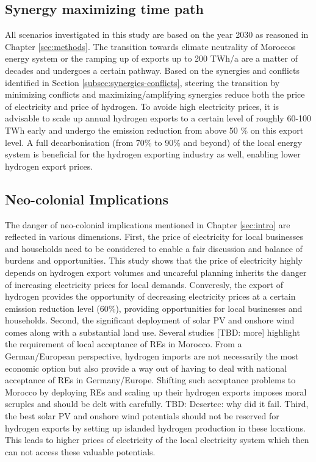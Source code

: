 \subsection{Synergy maximizing time path}
\label{subsec:timepath}
All scenarios investigated in this study are based on the year 2030 as reasoned in Chapter \ref{sec:methods}. The transition towards climate neutrality of Moroccos energy system or the ramping up of exports up to 200 TWh/a are a matter of decades and undergoes a certain pathway. Based on the synergies and conflicts identified in Section \ref{subsec:synergies-conflicts}, steering the transition by minimizing conflicts and maximizing/amplifying synergies reduce both the price of electricity and price of hydrogen. To avoide high electricity prices, it is advisable to scale up annual hydrogen exports to a certain level of roughly 60-100 TWh early and undergo the emission reduction from above 50 \% on this export level. A full decarbonisation (from 70\% to 90\% and beyond) of the local energy system is beneficial for the hydrogen exporting industry as well, enabling lower hydrogen export prices.


\subsection{Neo-colonial Implications}
\label{subsec:neocolonial}
The danger of neo-colonial implications mentioned in Chapter \ref{sec:intro} are reflected in various dimensions. 
First, the price of electricity for local businesses and households need to be considered to enable a fair discussion and balance of burdens and opportunities. This study shows that the price of electricity highly depends on hydrogen export volumes and uncareful planning inherits the danger of increasing electricity prices for local demands. Converesly, the export of hydrogen provides the opportunity of decreasing electricity prices at a certain emission reduction level (60\%), providing opportunities for local businesses and households.
Second, the significant deployment of solar PV and onshore wind comes along with a substantial land use. Several studies \cite{TerraponPfaff2019} [TBD: more] highlight the requirement of local acceptance of REs in Morocco. From a German/European perspective, hydrogen imports are not necessarily the most economic option but also provide a way out of having to deal with national acceptance of REs in Germany/Europe. Shifting such acceptance problems to Morocco by deploying REs and scaling up their hydrogen exports imposes moral scruples and should be delt with carefully. TBD: Desertec: why did it fail.
Third, the best solar PV and onshore wind potentials should not be reserved for hydrogen exports by setting up islanded hydrogen production in these locations. This leads to higher prices of electricity of the local electricity system which then can not access these valuable potentials.

